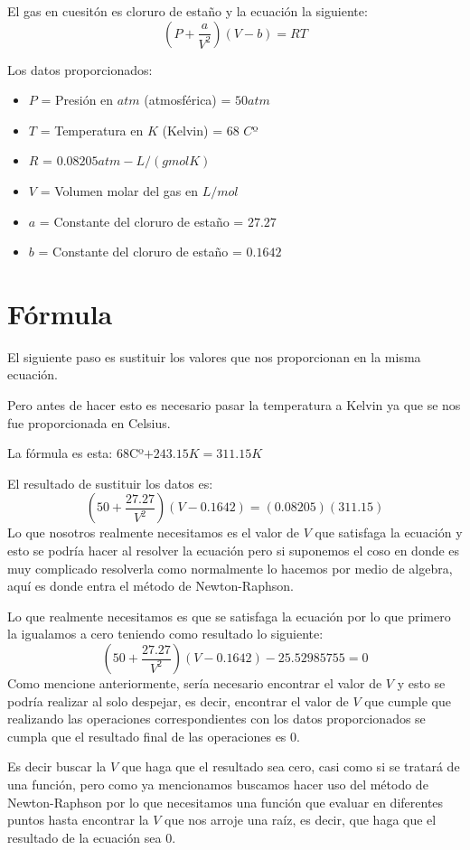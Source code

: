 \documentclass{article}
\begin{document}
El gas en cuesitón es cloruro de estaño y la ecuación la siguiente:
$$ (P+\frac{a}{V^2})(V-b)=RT $$

Los datos proporcionados:
\begin{itemize}
    \item $P$ = Presión en $atm$ (atmosférica) = $50 atm$
    \item $T$ = Temperatura en $K$ (Kelvin) = $68$ $C$º
    \item $R$ = $0.08205 atm-L/(gmolK)$
    \item $V$ = Volumen molar del gas en $L/mol$
    \item $a$ = Constante del cloruro de estaño = $27.27$
    \item $b$ = Constante del cloruro de estaño = $0.1642$
\end{itemize}

\section{Fórmula}
El siguiente paso es sustituir los valores que nos proporcionan en la misma ecuación.

Pero antes de hacer esto es necesario pasar la temperatura a Kelvin ya que se nos fue proporcionada en Celsius.

La fórmula es esta: $68$Cº$+243.15K= 311.15K$


El resultado de sustituir los datos es:
$$ (50+\frac{27.27}{V^2})(V-0.1642)=(0.08205)(311.15) $$
Lo que nosotros realmente necesitamos es el valor de $V$ que satisfaga la ecuación y esto se podría hacer al resolver la ecuación pero si suponemos el coso en donde es muy complicado resolverla como normalmente lo hacemos por medio de algebra, aquí es donde entra el método de Newton-Raphson.

Lo que realmente necesitamos es que se satisfaga la ecuación por lo que primero la igualamos a cero teniendo como resultado lo siguiente:
$$ (50+\frac{27.27}{V^2})(V-0.1642)-25.52985755=0$$
Como mencione anteriormente, sería necesario encontrar el valor de $V$ y esto se podría realizar al solo despejar, es decir, encontrar el valor de $V$ que cumple que realizando las operaciones correspondientes con los datos proporcionados se cumpla que el resultado final de las operaciones es 0.

Es decir buscar la $V$ que haga que el resultado sea cero, casi como si se tratará de una función, pero como ya mencionamos buscamos hacer uso del método de Newton-Raphson por lo que necesitamos una función que evaluar en diferentes puntos hasta encontrar la $V$ que nos arroje una raíz, es decir, que haga que el resultado de la ecuación sea 0.
\end{document}
